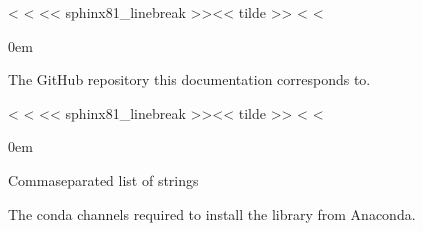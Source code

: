 \documentclass[letterpaper,10pt,english]{sphinxmanual}
\begin{document}

\begin{fulllineitems}
\label{\detokenize{confval:confval-github_repository}}
<%
\pysigstartsignatures
<%
\pysigline<< sphinx81_linebreak >>{}<< tilde >>
<%
<%
\vspace{-30px}

\begin{DUlineblock}{0em}
\item[]  
\item[]  
\end{DUlineblock}

\vspace{-25px}

The GitHub repository this documentation corresponds to.

\end{fulllineitems}


\begin{fulllineitems}
\label{\detokenize{confval:confval-conda_channels}}
<%
\pysigstartsignatures
<%
\pysigline<< sphinx81_linebreak >>{}<< tilde >>
<%
<%
\vspace{-30px}

\begin{DUlineblock}{0em}
\item[]  Comma\sphinxhyphen{}separated list of strings
\item[]  
\end{DUlineblock}

\vspace{-25px}

The conda channels required to install the library from Anaconda.

\end{fulllineitems}
\end{document}
